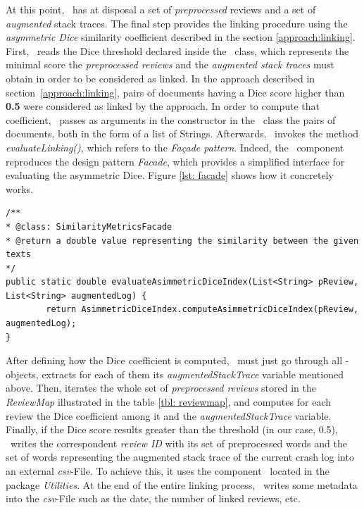 At this point, \toolname\ has at disposal a set of \textit{preprocessed} reviews and a set of \textit{augmented} stack traces. 
The final step provides the linking procedure using the \textit{asymmetric Dice} similarity coefficient described in the section \ref{approach:linking}. \\
First, \toolname\ reads the Dice threshold declared inside the \Linker\ class, which represents the minimal score the \textit{preprocessed reviews} and the \textit{augmented stack traces} must obtain in order to be considered as linked. 
In the approach described in section~\ref{approach:linking}, pairs of documents having a Dice score higher than \textbf{0.5} were considered as linked by the approach.
In order to compute that coefficient, \toolname\ passes as arguments in the constructor in the \Linker\ class the pairs of documents, both in the form of a list of Strings. 
Afterwards, \Linker\ invokes the method \textit{evaluateLinking()}, which refers to the \textit{Façade pattern}. 
Indeed, the \Facade\ component reproduces the design pattern \textit{Facade}, 
which provides a simplified interface for evaluating the asymmetric Dice. 
Figure \ref{lst: facade} shows how it concretely works. 
\begin{lstlisting}[caption=\Facade implementing the design pattern \textit{Facade},label={lst: facade}]
/**
* @class: SimilarityMetricsFacade
* @return a double value representing the similarity between the given texts
*/
public static double evaluateAsimmetricDiceIndex(List<String> pReview, List<String> augmentedLog) {
        return AsimmetricDiceIndex.computeAsimmetricDiceIndex(pReview, augmentedLog);
}
\end{lstlisting}
After defining how the Dice coefficient is computed, \toolname\ must just go through all \Crash-objects, extracts for each of them its \textit{augmentedStackTrace} variable mentioned above. Then, iterates the whole set of \textit{preprocessed reviews} stored in the \textit{ReviewMap} illustrated in the table \ref{tbl: reviewmap}, and computes for each review the Dice coefficient among it and the \textit{augmentedStackTrace} variable. 
Finally, if the Dice score results greater than the threshold (in our case, 0.5), \toolname\ writes the correspondent \textit{review ID} with its set of preprocessed words and the set of words representing the augmented stack trace of the current crash log into an external \textit{csv}-File. To achieve this, it uses the component \Writer\, located in the package \textit{Utilities}. 
At the end of the entire linking process, \toolname\ writes some metadata into the \textit{csv}-File such as the date, the number of linked reviews, etc. 
